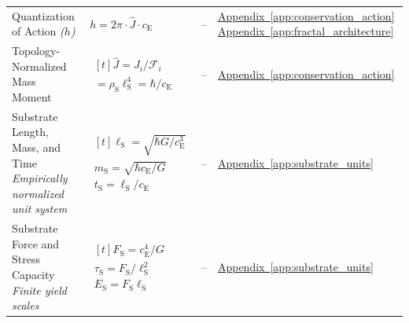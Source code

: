 \begin{longtable}{@{} p{4.5cm} p{6cm} c p{4cm} @{}}
{\raggedright Quantization of Action \newline \textit{($h$)}\par} & {\raggedright $h = 2\pi \cdot \hat{J} \cdot c_{\mathrm{E}}$\par} & -- & {\raggedright \hyperref[app:conservation_action]{Appendix~\ref*{app:conservation_action}} \newline \hyperref[app:fractal_architecture]{Appendix~\ref*{app:fractal_architecture}}\par} \\

{\raggedright Topology-Normalized Mass Moment\par} & {\raggedright $\begin{gathered}[t]\widehat J=J_i/\mathcal F_i \\ =\rho_{\mathrm S}\ell_{\mathrm S}^4=\hbar/c_{\mathrm E}\end{gathered}$\par} & -- & {\raggedright \hyperref[app:conservation_action]{Appendix~\ref*{app:conservation_action}}\par} \\

{\raggedright Substrate Length, Mass, and Time \newline \textit{Empirically normalized unit system}\par} & {\raggedright $\begin{gathered}[t]\ell_{\mathrm S}=\sqrt{\hbar G/c_{\mathrm E}^3} \\ m_{\mathrm S}=\sqrt{\hbar c_{\mathrm E}/G} \\ t_{\mathrm S}=\ell_{\mathrm S}/c_{\mathrm E}\end{gathered}$\par} & -- & {\raggedright \hyperref[app:substrate_units]{Appendix~\ref*{app:substrate_units}}\par} \\

{\raggedright Substrate Force and Stress Capacity \newline \textit{Finite yield scales}\par} & {\raggedright $\begin{gathered}[t]F_{\mathrm S}=c_{\mathrm E}^4/G \\ \tau_{\mathrm S}=F_{\mathrm S}/\ell_{\mathrm S}^2 \\ E_{\mathrm S}=F_{\mathrm S}\ell_{\mathrm S}\end{gathered}$\par} & -- & {\raggedright \hyperref[app:substrate_units]{Appendix~\ref*{app:substrate_units}}\par} \\


\end{longtable}
